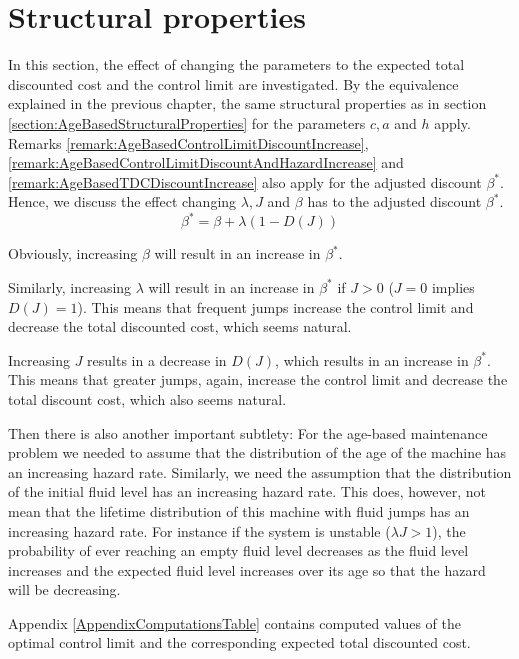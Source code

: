 \section{Structural properties}
In this section, the effect of changing the parameters to the expected total discounted cost and the control limit are investigated.
By the equivalence explained in the previous chapter, the same structural properties as in section \ref{section:AgeBasedStructuralProperties} for the parameters $c,a$ and $h$ apply.
Remarks \ref{remark:AgeBasedControlLimitDiscountIncrease}, \ref{remark:AgeBasedControlLimitDiscountAndHazardIncrease} and \ref{remark:AgeBasedTDCDiscountIncrease} also apply for the adjusted discount $\beta^*$.
Hence, we discuss the effect changing $\lambda,J$ and $\beta$ has to the adjusted discount $\beta^*$.
\[
\beta^*=\beta+\lambda(1-D(J))
\]
\begin{remark}
	Obviously, increasing $\beta$ will result in an increase in $\beta^*$.
\end{remark}
\begin{remark}
Similarly, increasing $\lambda$ will result in an increase in $\beta^*$ if $J>0$ ($J=0$ implies $D(J)=1$).
This means that frequent jumps increase the control limit and decrease the total discounted cost, which seems natural.
\end{remark}
\begin{remark}
	Increasing $J$ results in a decrease in $D(J)$, which results in an increase in $\beta^*$.
	This means that greater jumps, again, increase the control limit and decrease the total discount cost, which also seems natural.
\end{remark}
Then there is also another important subtlety: For the age-based maintenance problem we needed to assume that the distribution of the age of the machine has an increasing hazard rate.
Similarly, we need the assumption that the distribution of the initial fluid level has an increasing hazard rate.
This does, however, not mean that the lifetime distribution of this machine with fluid jumps has an increasing hazard rate.
For instance if the system is unstable ($\lambda J>1$), the probability of ever reaching an empty fluid level decreases as the fluid level increases and the expected fluid level increases over its age so that the hazard will be decreasing.

Appendix \ref{AppendixComputationsTable} contains computed values of the optimal control limit and the corresponding expected total discounted cost.